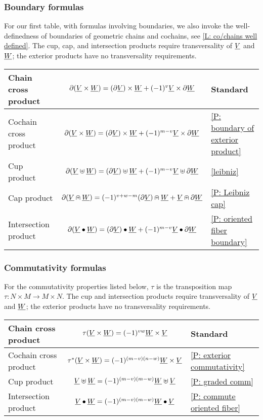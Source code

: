\subsubsection{Boundary formulas}


For our first table, with formulas involving boundaries, we also invoke the well-definedness of boundaries of geometric chains and cochains, see \cref{L: co/chains well defined}. The cup, cap, and intersection products require transversality of $\underline{V}$ and $\underline{W}$; the exterior products have no transversality requirements.

\bigskip

\begin{minipage}{\linewidth}
\centering

\begin{tabular}{|l|c|l|}
\hline
Chain cross product &$\partial(\underline{V} \times \underline{W}) = (\partial \underline{V}) \times \underline{W}+ (-1)^{v}\underline{V} \times \partial \underline{W}$&Standard \\
\hline
Cochain cross product&$\partial(\underline{V} \times \underline{W}) = (\partial \underline{V}) \times \underline{W}+ (-1)^{m-v}\underline{V} \times \partial \underline{W}$&\cref{P: boundary of exterior product}\\
\hline
Cup product&$\partial (\underline{V} \uplus \underline{W}) = (\partial \underline{V}) \uplus \underline{W}+ (-1)^{m-v} \underline{V} \uplus \partial \underline{W}$&\cref{leibniz}\\
\hline
Cap product&$\partial(\underline{V}\nplus \underline{W}) = (-1)^{v+w-m} (\partial \underline{V})\nplus \underline{W} + \underline{V}\nplus\partial \underline{W}$&\cref{P: Leibniz cap}\\
\hline
Intersection product &$\partial (\underline{V} \bullet \underline{W}) = (\partial \underline{V}) \bullet \underline{W} + (-1)^{m-v}\underline{V} \bullet \partial \underline{W}$&\cref{P: oriented fiber boundary}\\
\hline
\end{tabular}
\end{minipage}




\subsubsection{Commutativity formulas}

 For the commutativity properties listed below, $\tau$ is the transposition map $\tau \colon N \times M \to M \times N$. The cup and intersection products require transversality of $\underline{V}$ and $\underline{W}$; the exterior products have no transversality requirements.

\bigskip

\begin{minipage}{\linewidth}
\centering


\begin{tabular}{|l|c|l|}
\hline
Chain cross product&$\tau(\underline{V} \times \underline{W}) = (-1)^{vw}\underline{W} \times \underline{V}$&Standard\\
\hline
Cochain cross product&$\tau^*(\underline{V} \times \underline{W}) = (-1)^{(m-v)(n-w)}\underline{W} \times \underline{V}$&\cref{P: exterior commutativity}\\
\hline
Cup product&$\underline{V}\uplus \underline{W} = (-1)^{(m-v)(m-w)} \underline{W}\uplus \underline{V}$&\cref{P: graded comm}\\
\hline
Intersection product&$\underline{V}\bullet \underline{W} = (-1)^{(m-v)(m-w)}\underline{W}\bullet \underline{V}$&\cref{P: commute oriented fiber}\\
\hline
\end{tabular}
\end{minipage}


